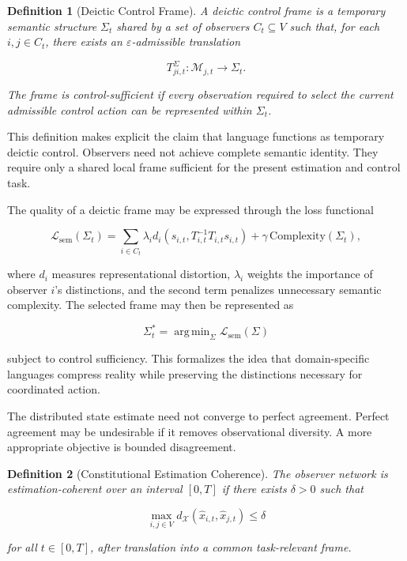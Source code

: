 \documentclass[12pt,a4paper]{article}
\newtheorem{definition}{Definition}
\DeclareMathOperator{\argmin}{arg\,min}
\begin{document}
\begin{definition}[Deictic Control Frame]
A deictic control frame is a temporary semantic structure \(\Sigma_t\) shared by a set of observers \(C_t\subseteq V\) such that, for each \(i,j\in C_t\), there exists an \(\varepsilon\)-admissible translation

\[
T_{ji,t}^{\Sigma}:
\mathcal{M}_{j,t}
\rightarrow
\Sigma_t.
\]

The frame is control-sufficient if every observation required to select the current admissible control action can be represented within \(\Sigma_t\).
\end{definition}

This definition makes explicit the claim that language functions as temporary deictic control. Observers need not achieve complete semantic identity. They require only a shared local frame sufficient for the present estimation and control task.

The quality of a deictic frame may be expressed through the loss functional

\[
\mathcal{L}_{\mathrm{sem}}(\Sigma_t)
=
\sum_{i\in C_t}
\lambda_i
d_i
\left(
s_{i,t},
T^{-1}_{i,t}T_{i,t}s_{i,t}
\right)
+
\gamma\,\mathrm{Complexity}(\Sigma_t),
\]

where \(d_i\) measures representational distortion, \(\lambda_i\) weights the importance of observer \(i\)'s distinctions, and the second term penalizes unnecessary semantic complexity. The selected frame may then be represented as

\[
\Sigma_t^{*}
=
\argmin_{\Sigma}
\mathcal{L}_{\mathrm{sem}}(\Sigma)
\]

subject to control sufficiency. This formalizes the idea that domain-specific languages compress reality while preserving the distinctions necessary for coordinated action.

The distributed state estimate need not converge to perfect agreement. Perfect agreement may be undesirable if it removes observational diversity. A more appropriate objective is bounded disagreement.

\begin{definition}[Constitutional Estimation Coherence]
The observer network is estimation-coherent over an interval \([0,T]\) if there exists \(\delta>0\) such that

\[
\max_{i,j\in V}
d_{\mathcal{X}}
\left(
\hat{x}_{i,t},
\hat{x}_{j,t}
\right)
\leq
\delta
\]

for all \(t\in[0,T]\), after translation into a common task-relevant frame.
\end{definition}
\end{document}
